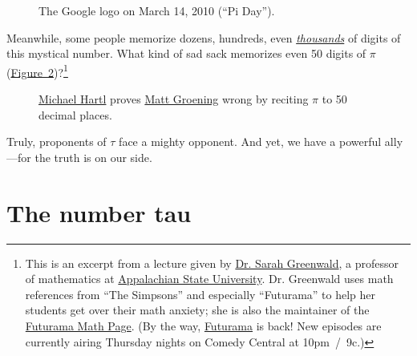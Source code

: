 \documentclass{article}
\begin{document}
\begin{figure}
\begin{center}
\end{center}
\caption{The Google logo on March 14, 2010 (``Pi Day'').\label{fig:google_pi_day.}}
\end{figure}

Meanwhile, some people memorize dozens, hundreds, even \href{http://en.wikipedia.org/wiki/Lu_Chao}{\emph{thousands}} of digits of this mystical number. What kind of sad sack memorizes even 50 digits of $\pi$ (\hyperref[fig:futurama_video]{Figure~}\ref{fig:futurama_video})?\footnote{This is an excerpt from a lecture given by \href{http://mathsci.appstate.edu/~sjg/}{Dr. Sarah Greenwald}, a professor of mathematics at \href{http://www.appstate.edu/}{Appalachian State University}. Dr. Greenwald uses math references from ``The Simpsons'' and especially ``Futurama'' to help her students get over their math anxiety; she is also the maintainer of the \href{http://www.mathsci.appstate.edu/~sjg/futurama/}{Futurama Math Page}. (By the way, \href{http://www.comedycentral.com/shows/futurama/index.jhtml}{Futurama} is back! New episodes are currently airing Thursday nights on Comedy Central at 10pm~/~9c.)}

\begin{figure}
\begin{center}
\end{center}
\caption{\href{\#sec:about_the_author}{Michael Hartl} proves \href{http://en.wikipedia.org/wiki/Matt_Groening}{Matt Groening} wrong by reciting $\pi$ to 50 decimal places.\label{fig:futurama_video}}
\end{figure}

Truly, proponents of $\tau$ face a mighty opponent. And yet, we have a powerful ally---for the truth is on our side.


\section{The number tau} %
\label{sec:the_number_tau}
\end{document}
